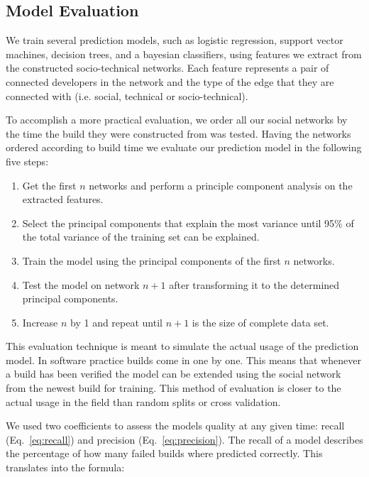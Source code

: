 \subsection{Model Evaluation}
We train several prediction models, such as logistic regression, support vector
machines, decision trees, and a bayesian classifiers, using features we
extract from the constructed socio-technical networks. Each feature represents a pair of
connected developers in the network and the type of the edge that they are
connected with (i.e. social, technical or socio-technical).

To accomplish a more practical evaluation, we order all our social networks by the time the build they were constructed from was tested.
Having the networks ordered according to build time we evaluate our prediction model in the following five steps:%

\begin{enumerate}
\item Get the first $n$ networks and perform a principle component analysis on the extracted features.
\item Select the principal components that explain the most variance until 95\% of the total variance of the training set can be explained.
\item Train the model using the principal components of the first $n$ networks.
\item Test the model on network $n+1$ after transforming it to the determined principal components.
\item Increase $n$ by 1 and repeat until $n+1$ is the size of complete data set.
\end{enumerate}

This evaluation technique is meant to simulate the actual usage of the prediction model.
In software practice builds come in one by one.
This means that whenever a build has been verified the model can be extended using the social network from the newest build for training. 
This method of evaluation is closer to the actual usage in the field than
random splits or cross validation.

We used two coefficients to assess the models quality at any given time: recall (Eq.~\ref{eq:recall}) and precision (Eq.~\ref{eq:precision}).
The recall of a model describes the percentage of how many failed builds where predicted correctly.
This translates into the formula:

